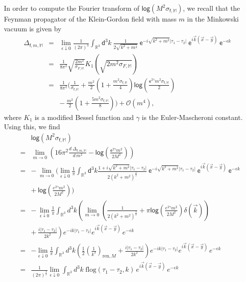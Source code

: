\documentclass[11pt]{book}
\renewcommand{\log}{\mathsf{log}}
\newcommand{\Ocal}{\mathcal{O}}
\newcommand{\Mbb}{\mathbb{M}}
\newcommand{\Rbb}{\mathbb{R}}
\newcommand{\dsf}{\mathsf{d}}
\newcommand{\esf}{\mathsf{e}}
\newcommand{\fsf}{\mathsf{f}}
\theoremstyle{break}
\begin{document}
In order to compute the Fourier transform of $\log\left( M^2 \sigma_{\fsf,\Mbb}\right)$, we recall that the Feynman propagator of the Klein-Gordon field with mass $m$ in the Minkowski vacuum is given by
%
\begin{eqnarray*}
\Delta_{\fsf,m,\Mbb}&=&\lim_{\epsilon\downarrow 0} \frac{1}{(2\pi)^3} \int_{\Rbb^3} \dsf^3k \ \frac{1}{2\sqrt{k^2+m^2}} \ \esf^{-i\sqrt{k^2+m^2}|\tau_1-\tau_2|} \ \esf^{i\vec{k}\left(\vec{x}-\vec{y}\right)} \ \esf^{-\epsilon k}\\
&=&\frac{1}{8\pi^2}\sqrt{\frac{2m^2}{\sigma_{F,\Mbb}}}K_1\left(\sqrt{2 m^2\sigma_{F,\Mbb}}\right)\\
&=&\frac{1}{8\pi^2} \bigg( \frac{1}{\sigma_{\fsf,\Mbb}} + \frac{m^2}{2} \left(1+\frac{m^2 \sigma_{\fsf,\Mbb}}{4} \right) \log\left(\frac{\esf^{2\gamma}m^2 \sigma_{\fsf,\Mbb}}{2}\right) \\
&& - \ \frac{m^2}{2} \left(1+\frac{5m^2\sigma_{\fsf,\Mbb}}{8}\right)\bigg) + \Ocal(m^4),
\end{eqnarray*}
%
where $K_1$  is a modified Bessel function and $\gamma$ is the Euler-Mascheroni constant. Using this, we find
%
\begin{eqnarray*}
&&\log \left(M^2 \sigma_{\fsf,\Mbb}\right) \\
%
&=&\lim_{m\to 0}\left(16\pi^2 \frac{d \ \Delta_{\fsf,m,\Mbb}}{d \,m^2} - 
\log\left(\frac{\esf^{2\gamma}m^2}{2 M^2}\right)\right)\\
%
&=& - \ \lim_{m\to 0}\bigg(\lim_{\epsilon\downarrow 0} \frac{1}{\pi} \int_{\Rbb^3} \dsf^3 k \frac{1+i\sqrt{k^2+m^2}|\tau_1-\tau_2|}{2(k^2+m^2)^{\frac32}} \ \esf^{-i\sqrt{k^2+m^2}|\tau_1-\tau_2|} \ \esf^{i\vec{k}\left(\vec{x}-\vec{y}\right)} \ \esf^{-\epsilon k} \\
&& + \ \log\left(\frac{e^{2\gamma}m^2}{2 M^2}\right)\bigg)\\
%
&=& - \ \lim_{\epsilon\downarrow 0}\frac{1}{\pi}\int_{\Rbb^3}d^3 k\left(\lim_{m\to 0}\left(\frac{1}{2(k^2+m^2)^{\frac32}}+\pi\log\left(\frac{e^{2\gamma}m^2}{2 M^2}\right)\delta(\vec{k})\right)\right.\\
%
&& \left.+ \ \frac{i|\tau_1-\tau_2|}{2k^2}\right)e^{-ik|\tau_1-\tau_2|}e^{i\vec{k}\left(\vec{x}-\vec{y}\right)}\,e^{-\epsilon k}\\
&=&-\lim_{\epsilon\downarrow 0}\frac{1}{\pi}\int_{\Rbb^3}d^3 k\left(\frac{1}{2}\left(\frac{1}{k^3}\right)_{\text{ren},M}+\frac{i|\tau_1-\tau_2|}{2k^2}\right)e^{-ik|\tau_1-\tau_2|}e^{i\vec{k}\left(\vec{x}-\vec{y}\right)}\,e^{-\epsilon k}\\
&=&\frac{1}{(2\pi)^{\frac32}}\lim_{\epsilon\downarrow 0}\int_{\Rbb^3}d^3 k \;
\text{flog}(\tau_1-\tau_2,k)\,e^{i\vec{k}\left(\vec{x}-\vec{y}\right)}\,e^{-\epsilon k}
\end{eqnarray*}
\end{document}
